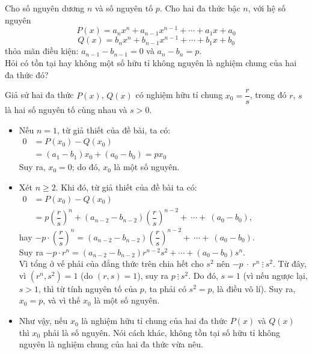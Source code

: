 \begin{bt}%
	Cho số nguyên dương $n$ và số nguyên tố $p$. Cho hai đa thức bậc $n$, với hệ số nguyên
	$$P(x)=a_nx^n+a_{n-1}x^{n-1}+\cdots+a_1x+a_0$$
	$$Q(x)=b_nx^n+b_{n-1}x^{n-1}+\cdots+b_1x+b_0$$
	thỏa mãn điều kiện: $a_{n-1}-b_{n-1}=0$ và $a_{n}-b_{n}=p$.\\
	Hỏi có tồn tại hay không một số hữu tỉ không nguyên là nghiệm chung của hai đa thức đó?
	\loigiai
	{
		Giả sử hai đa thức $P(x)$, $Q(x)$ có nghiệm hữu tỉ chung $x_0=\dfrac{r}{s}$, trong đó $r$, $s$ là hai số nguyên tố cùng nhau và $s>0$.
		\begin{itemize}
			\item Nếu $n=1$, từ giả thiết của đề bài, ta có:\\
			$\begin{aligned}
			0&=P(x_0)-Q(x_0)\\
			&=(a_1-b_1)x_0+(a_0-b_0)=px_0
			\end{aligned}$\\
			Suy ra, $x_0=0$; do đó, $x_0$ là một số nguyên.
			\item Xét $n\geq2$. Khi đó, từ giả thiết của đề bài ta có: \\
			$\begin{aligned}
			0&=P(x_0)-Q(x_0)\\
			&=p\left(\dfrac{r}{s}\right)^n+(a_{n-2}-b_{n-2})\left(\dfrac{r}{s}\right)^{n-2}+\ \cdots+\ (a_0-b_0),
			\end{aligned}$\\
			hay $-p\cdot\left(\dfrac{r}{s}\right)^n=(a_{n-2}-b_{n-2})\left(\dfrac{r}{s}\right)^{n-2}+\ \cdots+\ (a_0-b_0)$.\\
			Suy ra $-p\cdot r^n=(a_{n-2}-b_{n-2})r^{n-2}s^2+\cdots+(a_0-b_0)s^n$.\\
			Vì tổng ở vế phải của đẳng thức trên chia hết cho $s^2$ nên $-p\ \cdot \ r^n\ \vdots \ s^2$. Từ đây, vì $\left(r^n,s^2\right)=1$ (do $(r,s)=1$), suy ra $p\ \vdots \ s^2$. Do đó, $s=1$ (vì nếu ngược lại, $s>1$, thì từ tính nguyên tố của $p$, ta phải có $s^2=p$, là điều vô lí). Suy ra, $x_0=p$, và vì thế $x_0$ là một số nguyên.
			\item Như vậy, nếu $x_0$ là nghiệm hữu tỉ chung của hai đa thức $P(x)$ và $Q(x)$ thì $x_0$ phải là số nguyên. Nói cách khác, không tồn tại số hữu tỉ không nguyên là nghiệm chung của hai đa thức vừa nêu.
		\end{itemize}
	}
\end{bt}
